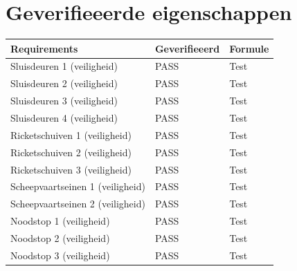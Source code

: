 \documentclass{article}
\begin{document}


\section {Geverifieeerde eigenschappen}
    \centering
    \begin{tabular}{ |p{4cm}||p{2cm}|p{5cm}|}
        \hline
            Requirements & Geverifieeerd & Formule \\
        \hline
        \hline
            Sluisdeuren 1 (veiligheid)          &           \leavevmode\color[HTML]{32CD32} PASS          &         Test        \\ \hline
            Sluisdeuren 2 (veiligheid)          &           \leavevmode\color[HTML]{32CD32} PASS          &         Test        \\ \hline
            Sluisdeuren 3 (veiligheid)          &           \leavevmode\color[HTML]{32CD32} PASS          &         Test        \\ \hline
            Sluisdeuren 4 (veiligheid)          &           \leavevmode\color[HTML]{32CD32} PASS          &         Test        \\ \hline
            Ricketschuiven 1 (veiligheid)       &           \leavevmode\color[HTML]{32CD32} PASS          &         Test        \\ \hline
            Ricketschuiven 2 (veiligheid)       &           \leavevmode\color[HTML]{32CD32} PASS          &         Test        \\ \hline
            Ricketschuiven 3 (veiligheid)       &           \leavevmode\color[HTML]{32CD32} PASS          &         Test        \\ \hline
            Scheepvaartseinen 1 (veiligheid)    &           \leavevmode\color[HTML]{32CD32} PASS          &         Test        \\ \hline
            Scheepvaartseinen 2 (veiligheid)    &           \leavevmode\color[HTML]{32CD32} PASS          &         Test        \\ \hline
            Noodstop 1 (veiligheid)             &           \leavevmode\color[HTML]{32CD32} PASS          &         Test        \\ \hline
            Noodstop 2 (veiligheid)             &           \leavevmode\color[HTML]{32CD32} PASS          &         Test        \\ \hline
            Noodstop 3 (veiligheid)             &           \leavevmode\color[HTML]{32CD32} PASS          &         Test        \\ \hline

\end{tabular}
\end{document}
